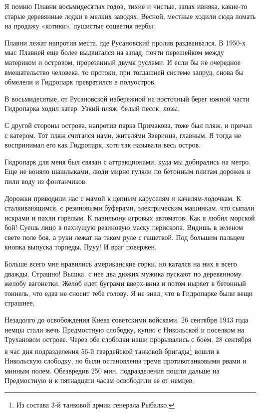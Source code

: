 Я помню Плавни восьмидесятых годов, тихие и чистые, запах ивняка, какие-то старые деревянные лодки в мелких заводях. Весной, местные ходили сюда ломать на продажу «котики», пушистые соцветия вербы.

Плавни лежат напротив места, где Русановский пролив раздваивался. В 1950-х мыс Плавней еще более выдвигался на запад, почти перешейком между материком и островом, прорезанный двумя руслами. И если бы не очередное вмешательство человека, то протоки, при тогдашней системе запруд, снова бы обмелели и Гидропарк превратился в полуостров.

В восьмидесятые, от Русановской набережной на восточный берег южной части Гидропарка ходил катер. Узкий пляж, белый песок, лозы. 

С другой стороны острова, напротив парка Примакова, тоже был пляж, и причал с катером. Тот пляж считался нами, жителями Зверинца, главным. Я тогда не воспринимал его как Гидропарк, хотя так называли весь остров.

Гидропарк для меня был связан с аттракционами, куда мы добирались на метро. Еще не воняло шашлыками, люди мирно гуляли по бетонным плитам дорожек и пили воду из фонтанчиков.

Дорожки приводили нас с мамой к цепным каруселям и качелям-лодочкам. К сталкивающимся, с резиновыми буферами, электрическим машинкам, что сыпали искрами и пахли горелым. К павильону игровых автоматов. Как я любил морской бой! Суешь лицо в пахнущую резиновую маску перископа. Видишь в зеленом свете поле боя, а руки лежат на таком руле с гашеткой. Под большим пальцем кнопка выпуска торпеды. Пууу! И враг повержен.

Больше всего мне нравились американские горки, но катался на них я всего дважды. Страшно! Вышка, с нее два дюжих мужика пускают по деревянному желобу вагонетки. Желоб идет буграми вверх-вниз и потом ныряет в бетонный тоннель, что едва не сносит тебе голову. Я не знал, что в Гидропарке были вещи страшнее.

Незадолго до освобождения Киева советскими войсками, 26 сентября 1943 года немцы стали жечь Предмостную слободку, купно с Никольской и поселком на Трухановом острове. Через обе слободки наши прорывались с боем. 28 сентября в час дня подразделения 56-й гвардейской танковой бригады\footnote{Из состава 3-й танковой армии генерала  Рыбалко.} вошли в Никольскую слободку, но были остановлены тремя противотанковыми рвами и минным полем. Обезвредив 250 мин, подразделения пошли дальше на Предмостную и к пятнадцати часам освободили ее от немцев.

